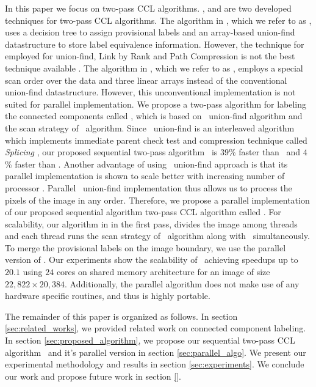 In this paper we focus on two-pass CCL algorithms. \cite{Wu2009_LRPC}, and \cite{He2012_ARun} are two
developed techniques for two-pass CCL algorithms.
The algorithm in \cite{Wu2009_LRPC}, which we refer to as \lrpc, uses a decision tree to assign provisional labels and an array-based union-find datastructure
to store label equivalence information. However, the technique for employed for union-find, Link by Rank and Path Compression is
not the best technique available \cite{}. 
The algorithm in \cite{He2012_ARun}, which we refer to as \arun, employs a special scan order over the data and three linear
arrays instead of the conventional union-find datastructure. However, this unconventional implementation is not suited for parallel implementation.
We propose a two-pass algorithm for labeling the connected components called
\aremsp, which is based on \rems\ union-find algorithm \cite{Patwary2010_RemSP}
and the scan strategy of \arun\ algorithm. Since \rems\ union-find is an
interleaved algorithm which implements immediate parent check test and 
compression technique called {\em Splicing} \cite{Patwary2010_RemSP}, our
proposed sequential two-pass algorithm \aremsp\ is $39$\% faster than \lrpc\
and $4$\% faster than \arun.
Another advantage of using \rems\ union-find approach is that its parallel implementation is shown to scale better
with increasing number of processor \cite{Patwary2012_PARemSP}. Parallel \rems\ union-find implementation thus allows us to
process the pixels of the image in any order. Therefore, we propose a parallel implementation of our proposed
sequential algorithm two-pass CCL algorithm called \paremsp. For scalability,
our algorithm in in the first pass, divides the image among threads and each
thread runs the scan strategy of \arun\ algorithm along with \remsp\
simultaneously. To merge the provisional labels on the image boundary, we use the parallel version of \remsp \cite{Patwary2012_PARemSP}. Our experiments show
the scalability of \paremsp\ achieving speedups up to $20.1$ using $24$ cores
on shared memory architecture for an image of size $22,822 \times 20,384$.
Additionally, the parallel algorithm does not make use of any hardware specific routines, and thus is highly portable.

The remainder of this paper is organized as follows. In section
\ref{sec:related_works}, we provided related work on connected component labeling.
In section \ref{sec:proposed_algorithm}, we propose our sequential two-pass CCL
algorithm \aremsp\ and it's parallel version in section
\ref{sec:parallel_algo}.
We present our experimental methodology and results in section
\ref{sec:experiments}. We conclude our work and propose future work in section \ref{}.


